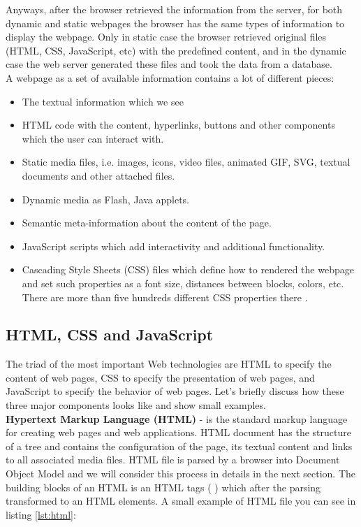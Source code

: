 Anyways, after the browser retrieved the information from the server, for both dynamic and static webpages the browser has the same types of information to display the webpage. Only in static case the browser retrieved original files (HTML, CSS, JavaScript, etc)  with the predefined content, and in the dynamic case the web server generated these files and took the data from a database.\\

A webpage as a set of available information contains a lot of different pieces:

\begin{itemize}
    \item The textual information which we see
    \item HTML code with the content, hyperlinks, buttons and other components which the user can interact with.
    \item Static media files, i.e. images, icons, video files, animated GIF, SVG, textual documents and other attached files.
    \item Dynamic media as Flash, Java applets.
    \item Semantic meta-information about the content of the page.
    \item JavaScript scripts which add interactivity and additional functionality.
    \item Cascading Style Sheets (CSS) files which define how to rendered the webpage and set such properties as a font size, distances between blocks, colors, etc. There are more than five hundreds different CSS properties there \cite{W3Schools}.
\end{itemize}

\subsection{HTML, CSS and JavaScript}
The triad of the most important Web technologies are HTML to specify the content of web pages, CSS to specify the presentation of web pages, and JavaScript to specify the behavior of web pages\cite{JSBook}. Let's briefly discuss how these three major components looks like and show small examples.\\

\noindent\textbf{Hypertext Markup Language (HTML)} - is the standard markup language for creating web pages and web applications. HTML document has the structure of a tree and contains the configuration of the page, its textual content and links to all associated media files. HTML file is parsed by a browser into Document Object Model and we will consider this process in details in the next section. The building blocks of an HTML is an HTML tags ( )  which after the parsing transformed to an HTML elements. A small example of HTML file you can see in listing \ref{lst:html}: \\

